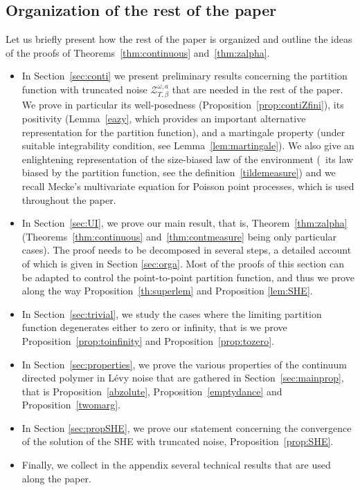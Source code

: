 \documentclass[10pt]{amsart}
\let\mathcal\mathscr
\theoremstyle{definition}
\newcommand{\cZ}{{\ensuremath{\mathcal Z}} }
\let\gb\beta
\let\go\omega
\begin{document}
\subsection{Organization of the rest of the paper}

Let us briefly present how the rest of the paper is organized and outline the ideas of the proofs of Theorems~\ref{thm:continuous}
and~\ref{thm:zalpha}.

\begin{itemize}
\item
In Section~\ref{sec:conti} we present preliminary
results concerning the partition function with truncated noise $\cZ_{T,\gb}^{\go,a}$ that are needed in the rest of the paper.
We prove in particular its well-posedness (Proposition~\ref{prop:contiZfini}), its positivity (Lemma~\ref{eazy}, which provides an important alternative representation for the partition function),
and a martingale property (under suitable integrability condition, see Lemma~\ref{lem:martingale}).
We also give an enlightening representation of
the size-biased law of the environment (\ie \ its law biased by the partition function, see the definition~\eqref{tildemeasure})
and we recall Mecke's multivariate equation for Poisson point processes, which is used throughout the paper.

\item
In Section~\ref{sec:UI}, we prove our main result, that is, Theorem~\ref{thm:zalpha}
(Theorems~\ref{thm:continuous} and~\ref{thm:contmeasure} being only particular cases).
The proof needs to be decomposed in several steps, a detailed account of which is given in Section \ref{sec:orga}. Most of the proofs of this section can be adapted to control the point-to-point
partition function, and thus we prove along the way Proposition~\ref{th:superlem} and Proposition \ref{lem:SHE}.

\item
In Section~\ref{sec:trivial}, we study the cases where the limiting partition function degenerates either to zero or infinity, that is we prove Proposition~\ref{prop:toinfinity} and
Proposition~\ref{prop:tozero}.

\item
In Section~\ref{sec:properties}, we prove the various properties of the continuum directed polymer in Lévy noise
that are gathered in Section~\ref{sec:mainprop},
that is
Proposition~\ref{abzolute},
Proposition~\ref{emptydance}
and
Proposition~\ref{twomarg}.

\item
In Section \ref{sec:propSHE},
we prove our statement concerning the convergence of the solution of the SHE with truncated noise, Proposition~\ref{prop:SHE}.

\item
Finally, we collect in the appendix several technical results that are used along the paper.
\end{itemize}
\end{document}
